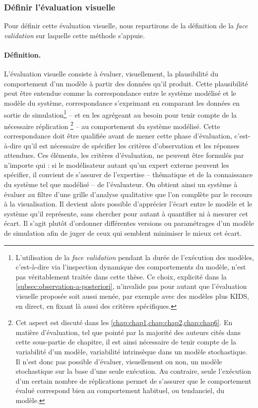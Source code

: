 \subsubsection{Définir l'évaluation visuelle} Pour définir cette évaluation visuelle, nous repartirons de la définition de la \textit{face validation} sur laquelle cette méthode s'appuie.

\paragraph{Définition.} L'évaluation visuelle consiste à évaluer, visuellement, la plausibilité du comportement d'un modèle à partir des données qu'il produit.
Cette plausibilité peut être entendue comme la correspondance entre le système modélisé et le modèle du système, correspondance s'exprimant en comparant les données en sortie de simulation\footnote{
	L'utilisation de la \textit{face validation} pendant la durée de l'exécution des modèles, c'est-à-dire via l'inspection dynamique des comportements du modèle, n'est pas véritablement traitée dans cette thèse.
	Ce choix, explicité dans la \cref{subsec:observation-a-posteriori}, n'invalide pas pour autant que l'évaluation visuelle proposée soit aussi menée, par exemple avec des modèles plus KIDS, \og en direct\fg{}, en fixant là aussi des critères spécifiques.
} -- et en les agrégeant au besoin pour tenir compte de la nécessaire réplication
\footnote{
	Cet aspect est discuté dans les \cref{chap:chap1,chap:chap2,chap:chap6}.
	En matière d'évaluation, tel que pointé par la majorité des auteurs cités dans cette sous-partie de chapitre, il est ainsi nécessaire de tenir compte de la variabilité d'un modèle, variabilité intrinsèque dans un modèle stochastique.
	Il n'est donc pas possible d'évaluer, visuellement ou non, un modèle stochastique sur la base d'une seule exécution. Au contraire, seule l'exécution d'un certain nombre de réplications permet de s'assurer que le comportement évalué correspond bien au comportement habituel, ou tendanciel, du modèle.
} -- au comportement du système modélisé.
Cette correspondance doit être qualifiée avant de mener cette phase d'évaluation, c'est-à-dire qu'il est nécessaire de spécifier les critères d'observation et les réponses attendues.
Ces éléments, les critères d'évaluation, ne peuvent être formulés par n'importe qui : si le modélisateur autant qu'un expert externe peuvent les spécifier, il convient de s'assurer de l'expertise -- thématique et de la connaissance du système tel que modélisé -- de l'évaluateur.
On obtient ainsi un système à évaluer au filtre d'une grille d'analyse qualitative que l'on complète par le recours à la visualisation.
Il devient alors possible d'apprécier l'écart entre le modèle et le système qu'il représente, sans chercher pour autant à quantifier ni à mesurer cet écart. 
Il s'agit plutôt d'ordonner différentes versions ou paramétrages d'un modèle de simulation afin de juger de ceux qui semblent minimiser le mieux cet écart.

